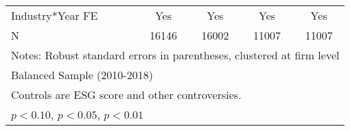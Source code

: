 \begin{table}[htbp]
\begin{tabular}{l*{4}{c}}
Industry*Year FE    &         Yes         &         Yes         &         Yes         &         Yes         \\
N                   &       16146         &       16002         &       11007         &       11007         \\
\bottomrule
\multicolumn{5}{l}{\footnotesize Notes: Robust standard errors in parentheses, clustered at firm level}\\
\multicolumn{5}{l}{\footnotesize Balanced Sample (2010-2018)}\\
\multicolumn{5}{l}{\footnotesize Controls are ESG score and other controversies.}\\
\multicolumn{5}{l}{\footnotesize \sym{*} \(p<0.10\), \sym{**} \(p<0.05\), \sym{***} \(p<0.01\)}\\
\end{tabular}
\end{table}
